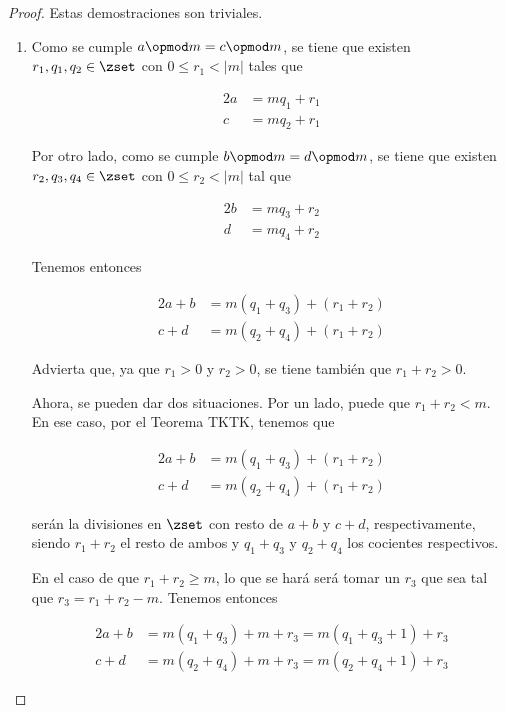 \begin{proof}
  Estas demostraciones son triviales.

  \begin{enumerate}
    \item Como se cumple $a \opmod m = c \opmod m$, se tiene que existen
      $r_1, q_1, q_2 \in \zset$ con $0 \leq r_1 < |m|$ tales que

      \begin{alignat*}{2}
        a &= mq_1 + r_1 \\
        c &= mq_2 + r_1
      \end{alignat*}

      Por otro lado, como se cumple $b \opmod m = d \opmod m$, se tiene que
      existen $r_2, q_3, q_4 \in \zset$ con $0 \leq r_2 < |m|$ tal que

      \begin{alignat*}{2}
        b &= mq_3 + r_2 \\
        d &= mq_4 + r_2
      \end{alignat*}

      Tenemos entonces

      \begin{alignat*}{2}
        a + b &= m(q_1 + q_3) + (r_1 + r_2) \\
        c + d &= m(q_2 + q_4) + (r_1 + r_2)
      \end{alignat*}

      \noindent Advierta que, ya que $r_1 > 0$ y $r_2 > 0$, se tiene también
      que $r_1 + r_2 > 0$.

      Ahora, se pueden dar dos situaciones. Por un lado, puede que $r_1 +
      r_2 < m$. En ese caso, por el Teorema TKTK, tenemos que

      \begin{alignat*}{2}
        a + b &= m(q_1 + q_3) + (r_1 + r_2) \\
        c + d &= m(q_2 + q_4) + (r_1 + r_2)
      \end{alignat*}

      \noindent serán la divisiones en $\zset$ con resto de $a + b$ y $c +
      d$, respectivamente, siendo $r_1 + r_2$ el resto de ambos y $q_1 +
      q_3$ y $q_2 + q_4$ los cocientes respectivos.

      En el caso de que $r_1 + r_2 \geq m$, lo que se hará será tomar un
      $r_3$ que sea tal que $r_3 = r_1 + r_2 - m$. Tenemos entonces

      \begin{alignat*}{2}
        a + b &= m(q_1 + q_3) + m + r_3 = m(q_1 + q_3 + 1) + r_3 \\
        c + d &= m(q_2 + q_4) + m + r_3 = m(q_2 + q_4 + 1) + r_3
      \end{alignat*}


\end{enumerate}
\end{proof}
